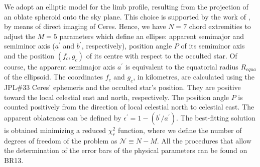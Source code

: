 \documentclass[useAMS,usenatbib]{mn2e}
\begin{document}
We adopt an elliptic model for the limb profile, resulting from the projection of an oblate spheroid onto the sky plane. This choice is supported by the work of \cite{Drummond2014}, by means of direct imaging of Ceres. Hence, we have $N=7$ chord extremities to adjust the $M=5$ parameters which define an ellipse: apparent semimajor and semiminor axis ($a^\prime$ and $b^\prime$, respectively), position angle $P$ of its semiminor axis and the position $(f_c,g_c)$ of its centre with respect to the occulted star. 
Of course, the apparent semimajor axis {$a^\prime$} is equivalent to the equatorial radius $R_{equa}$ of the ellipsoid.
The coordinates $f_{c}$ and $g_{c}$, in kilometres, are calculated using the JPL\#33 Ceres' ephemeris \citep{Giorgini1996} and the occulted star's position. They are positive toward the local celestial east and north, respectively. The position angle $P$ is counted positively from the direction of local celestial north to celestial east. The apparent oblateness can be defined by $\epsilon^\prime = 1 - (b^\prime/a^\prime)$. The best-fitting solution is obtained minimizing a reduced $\chi^{2}_{r}$ function, where we define the number of degrees of freedom of the problem as $\mathcal{N} \equiv N - M$.  All the procedures that allow the determination of the error bars of the physical parameters can be found on BR13.


\end{document}
